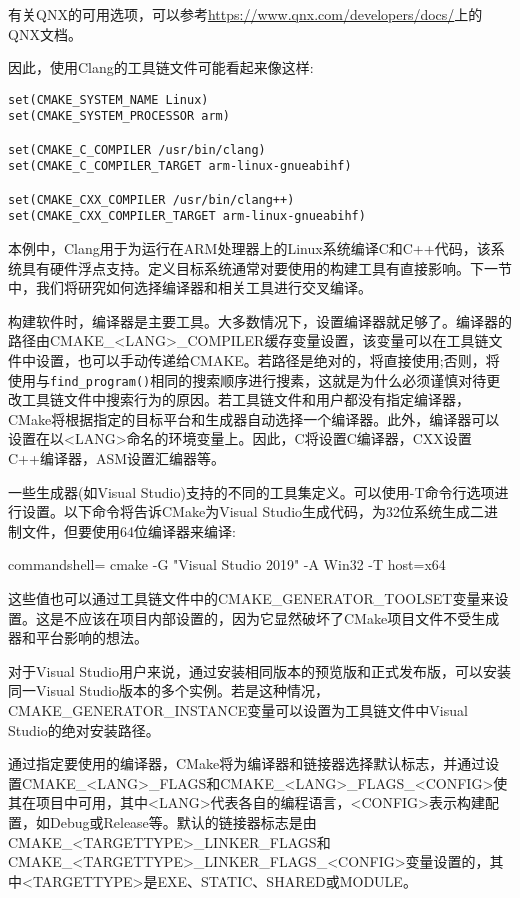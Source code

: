 有关QNX的可用选项，可以参考\url{https://www.qnx.com/developers/docs/}上的QNX文档。

因此，使用Clang的工具链文件可能看起来像这样:

\begin{lstlisting}[style=styleCMake]
set(CMAKE_SYSTEM_NAME Linux)
set(CMAKE_SYSTEM_PROCESSOR arm)

set(CMAKE_C_COMPILER /usr/bin/clang)
set(CMAKE_C_COMPILER_TARGET arm-linux-gnueabihf)

set(CMAKE_CXX_COMPILER /usr/bin/clang++)
set(CMAKE_CXX_COMPILER_TARGET arm-linux-gnueabihf)
\end{lstlisting}

本例中，Clang用于为运行在ARM处理器上的Linux系统编译C和C++代码，该系统具有硬件浮点支持。定义目标系统通常对要使用的构建工具有直接影响。下一节中，我们将研究如何选择编译器和相关工具进行交叉编译。


构建软件时，编译器是主要工具。大多数情况下，设置编译器就足够了。编译器的路径由CMAKE\_<LANG>\_COMPILER缓存变量设置，该变量可以在工具链文件中设置，也可以手动传递给CMAKE。若路径是绝对的，将直接使用;否则，将使用与\texttt{find\_program()}相同的搜索顺序进行搜素，这就是为什么必须谨慎对待更改工具链文件中搜索行为的原因。若工具链文件和用户都没有指定编译器，CMake将根据指定的目标平台和生成器自动选择一个编译器。此外，编译器可以设置在以<LANG>命名的环境变量上。因此，C将设置C编译器，CXX设置C++编译器，ASM设置汇编器等。

一些生成器(如Visual Studio)支持的不同的工具集定义。可以使用-T命令行选项进行设置。以下命令将告诉CMake为Visual Studio生成代码，为32位系统生成二进制文件，但要使用64位编译器来编译:

\begin{tcblisting}{commandshell={}}
cmake -G "Visual Studio 2019" -A Win32 -T host=x64
\end{tcblisting}

这些值也可以通过工具链文件中的CMAKE\_GENERATOR\_TOOLSET变量来设置。这是不应该在项目内部设置的，因为它显然破坏了CMake项目文件不受生成器和平台影响的想法。

对于Visual Studio用户来说，通过安装相同版本的预览版和正式发布版，可以安装同一Visual Studio版本的多个实例。若是这种情况，CMAKE\_GENERATOR\_INSTANCE变量可以设置为工具链文件中Visual Studio的绝对安装路径。

通过指定要使用的编译器，CMake将为编译器和链接器选择默认标志，并通过设置CMAKE\_<LANG>\_FLAGS和CMAKE\_<LANG>\_FLAGS\_<CONFIG>使其在项目中可用，其中<LANG>代表各自的编程语言，<CONFIG>表示构建配置，如Debug或Release等。默认的链接器标志是由CMAKE\_<TARGETTYPE>\_LINKER\_FLAGS和CMAKE\_<TARGETTYPE>\_LINKER\_FLAGS\_<CONFIG>变量设置的，其中<TARGETTYPE>是EXE、STATIC、SHARED或MODULE。


